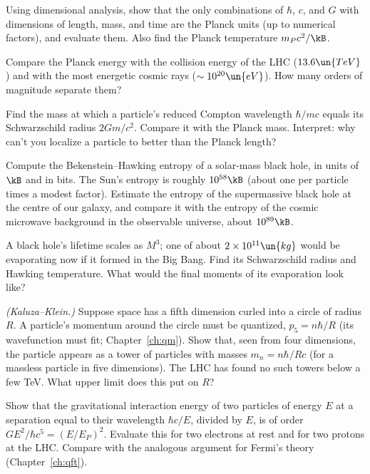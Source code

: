 \begin{problems}
\core Using dimensional analysis, show that the only combinations of $\hbar$, $c$, and $G$ with dimensions of length, mass, and time are the Planck units (up to numerical factors), and evaluate them. Also find the Planck temperature $m_Pc^2/\kB$.

 Compare the Planck energy with the collision energy of the LHC ($13.6\un{TeV}$) and with the most energetic cosmic rays ($\sim10^{20}\un{eV}$). How many orders of magnitude separate them?

\core \label{prob:planck-mass} Find the mass at which a particle's reduced Compton wavelength $\hbar/mc$ equals its Schwarzschild radius $2Gm/c^2$. Compare it with the Planck mass. Interpret: why can't you localize a particle to better than the Planck length?

\core \label{prob:bh-entropy} Compute the Bekenstein--Hawking entropy of a solar-mass black hole, in units of $\kB$ and in bits. The Sun's entropy is roughly $10^{58}\kB$ (about one per particle times a modest factor). Estimate the entropy of the supermassive black hole at the centre of our galaxy, and compare it with the entropy of the cosmic microwave background in the observable universe, about $10^{89}\kB$.

 A black hole's lifetime scales as $M^3$; one of about $2\times10^{11}\un{kg}$ would be evaporating now if it formed in the Big Bang. Find its Schwarzschild radius and Hawking temperature. What would the final moments of its evaporation look like?

\core \label{prob:kk} \emph{(Kaluza--Klein.)} Suppose space has a fifth dimension curled into a circle of radius $R$. A particle's momentum around the circle must be quantized, $p_5 = n\hbar/R$ (its wavefunction must fit; Chapter~\ref{ch:qm}). Show that, seen from four dimensions, the particle appears as a tower of particles with masses $m_n = n\hbar/Rc$ (for a massless particle in five dimensions). The LHC has found no such towers below a few TeV. What upper limit does this put on $R$?

 \label{prob:nonrenorm} Show that the gravitational interaction energy of two particles of energy $E$ at a separation equal to their wavelength $\hbar c/E$, divided by $E$, is of order $GE^2/\hbar c^5 = (E/E_P)^2$. Evaluate this for two electrons at rest and for two protons at the LHC. Compare with the analogous argument for Fermi's theory (Chapter~\ref{ch:qft}).


\end{problems}
